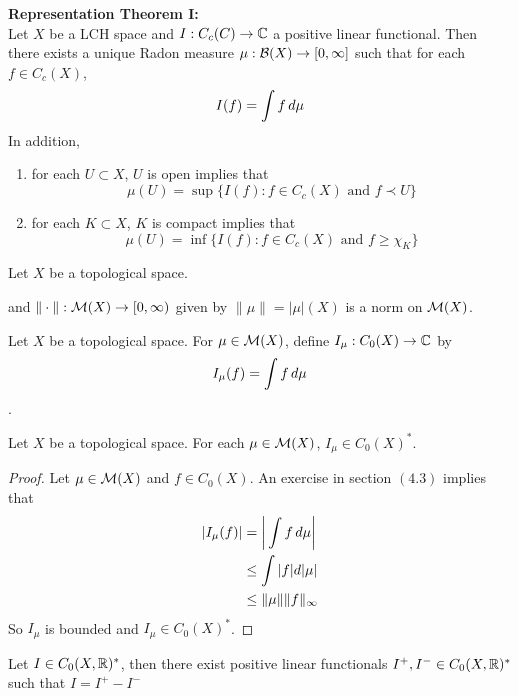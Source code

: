 \documentclass{book}
\begin{document}
	\begin{thm}\textbf{Representation Theorem I:}\\
	Let $X$ be a LCH space and $I: C_c(C) \rightarrow \mathbb{C}$ a positive linear functional. Then there exists a unique Radon measure $\mu:\mathcal{B}(X) \rightarrow [0,\infty]$ such that for each $f \in C_c(X)$, $$I(f) = \int f \, d \mu$$ 
	In addition, 
	\begin{enumerate}
	\item for each $U \subset X$, $U$ is open implies that $$\mu(U) = \sup \{I(f): f \in C_c(X) \text{ and } f \prec U \}$$
	\item for each $K \subset X$, $K$ is compact implies that $$\mu(U) = \inf \{I(f): f \in C_c(X) \text{ and } f  \geq \chi_K \}$$
\end{enumerate}	 
	\end{thm}
	
	\begin{ex}
	Let $X$ be a topological space.
	
	and $\|\cdot\|: \mathcal{M}(X) \rightarrow [0,\infty)$ given by $\| \mu \| = |\mu|(X)$ is a norm on $\mathcal{M}(X)$. 
	\end{ex}		
	
	\begin{defn} \ld{00000} 
	Let $X$ be a topological space. For $\mu \in \mathcal{M}(X)$, define $I_{\mu} :C_0(X) \rightarrow \mathbb{C}$ by $$I_{\mu} (f) = \int f \, d \mu$$.
	\end{defn}
	
	\begin{ex}  
	Let $X$ be a topological space. For each $\mu \in \mathcal{M}(X)$, $I_\mu \in C_0(X)^*$.
	\end{ex}
	
	\begin{proof}
	Let $\mu \in \mathcal{M}(X)$ and $f \in C_0(X)$. An exercise in section $(4.3)$ implies that 
	\begin{align*}
	|I_{\mu}(f)| 
	&= \bigg| \int f \, d \mu \bigg| \\
	& \leq \int |f| d |\mu| \\
	& \leq \| \mu \| \|f\|_{\infty}
	\end{align*}
	So $I_{\mu}$ is bounded and $I_{\mu} \in C_0(X)^*$.
	\end{proof}
	
	\begin{thm}
	Let $I \in C_0(X, \mathbb{R})^*$, then there exist positive linear functionals $I^+, I^- \in C_0(X, \mathbb{R})^*$ such that $I = I^+ - I^-$
	\end{thm}
	
\end{document}
